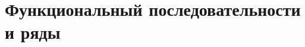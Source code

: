 \documentclass[a4paper,12pt]{book}
\theoremstyle{plain}
\theoremstyle{definition}
\theoremstyle{remark}
\begin{document}
  
  \tableofcontents

  \part{Функциональный последовательности и ряды}
  
\end{document}
